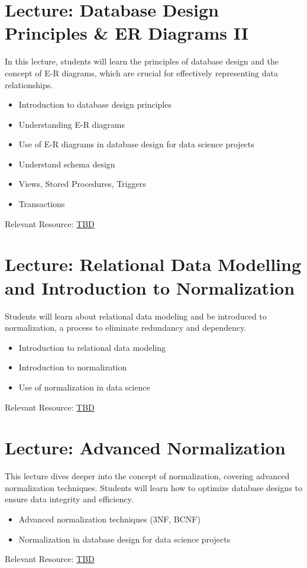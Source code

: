 \documentclass[11pt, letterpaper]{article}
\let\oldsection\section
\renewcommand\section{\clearpage\oldsection}
\begin{document}
	\section*{Lecture: Database Design Principles \& ER Diagrams II}
	In this lecture, students will learn the principles of database design and the concept of E-R diagrams, which are crucial for effectively representing data relationships.
	\begin{itemize}
		\item Introduction to database design principles
		\item Understanding E-R diagrams
		\item Use of E-R diagrams in database design for data science projects
		\item Understand schema design
		\item Views, Stored Procedures, Triggers
		\item Transactions
	\end{itemize}
	Relevant Resource: \href{https://example.com}{TBD}
	
	\section*{Lecture: Relational Data Modelling and Introduction to Normalization}
	Students will learn about relational data modeling and be introduced to normalization, a process to eliminate redundancy and dependency.
	\begin{itemize}
		\item Introduction to relational data modeling
		\item Introduction to normalization
		\item Use of normalization in data science
	\end{itemize}
	Relevant Resource: \href{https://example.com}{TBD}
	
	\section*{Lecture: Advanced Normalization}
	This lecture dives deeper into the concept of normalization, covering advanced normalization techniques. Students will learn how to optimize database designs to ensure data integrity and efficiency.
	\begin{itemize}
		\item Advanced normalization techniques (3NF, BCNF)
		\item Normalization in database design for data science projects
	\end{itemize}
	Relevant Resource: \href{https://example.com}{TBD}
	
\end{document}

